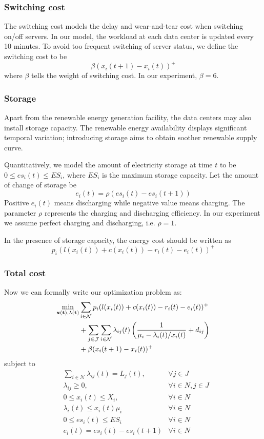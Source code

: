 \documentclass{acm_proc_article-sp}
\begin{document}
\subsubsection{Switching cost}
The switching cost models the delay and wear-and-tear cost when switching on/off servers. In our model, the workload at each data center is updated every 10 minutes. To avoid too frequent switching of server status, we define the switching cost to be
$$\beta(x_i(t+1) - x_i(t))^+$$
where $\beta$ tells the weight of switching cost. In our experiment, $\beta = 6$.

\subsubsection{Storage}
Apart from the renewable energy generation facility, the data centers may also install storage capacity. The renewable energy availability displays significant temporal variation; introducing storage aims to obtain soother renewable supply curve.

Quantitatively, we model the amount of electricity storage at time $t$ to be $0 \leq es_i(t) \leq ES_i$, where $ES_i$ is the maximum storage capacity. Let the amount of change of storage be 
$$e_i(t) = \rho (es_i(t) - es_i(t+1))$$
Positive $e_i(t)$ means discharging while negative value means charging. The parameter $\rho$ represents the charging and discharging efficiency. In our experiment we assume perfect charging and discharging, i.e. $\rho = 1$.

In the presence of storage capacity, the energy cost should be written as 
\begin{equation}
p_i(l(x_i(t)) + c(x_i(t)) - r_i(t) - e_i(t))^+
\end{equation} 

\subsubsection{Total cost}
Now we can formally write our optimization problem as:
\begin{align*}
\min_{\bf{x}(t), \bf{\lambda}(t)} & \sum_{i \in \mathcal{N}} p_i(l(x_i(t)) + c(x_i(t)) - r_i(t) - e_i(t))^+ \\
& + \sum_{j \in \mathcal{J}}\sum_{i \in \mathcal{N}}
\lambda_{ij}(t)\left(\frac{1}{\mu_i - \lambda_i(t)/x_i(t)} + d_{ij}\right) \\
& + \beta(x_i(t+1) - x_i(t))^+
\end{align*}
subject to
\begin{align*}
& \sum_{i\in \mathcal{N}}\lambda_{ij}(t) = L_j(t), &\forall j\in J  \\
& \lambda_{ij} \geq 0, & \forall i\in N, j\in J  \\
& 0 \leq x_i(t) \leq X_i, & \forall i \in N  \\
& \lambda_i(t) \leq x_i(t)\mu_i & \forall i \in N \\
& 0 \leq es_i(t) \leq ES_i & \forall i \in N \\
& e_i(t) = es_i(t) - es_i(t+1) & \forall i \in N
\end{align*}
\end{document}

